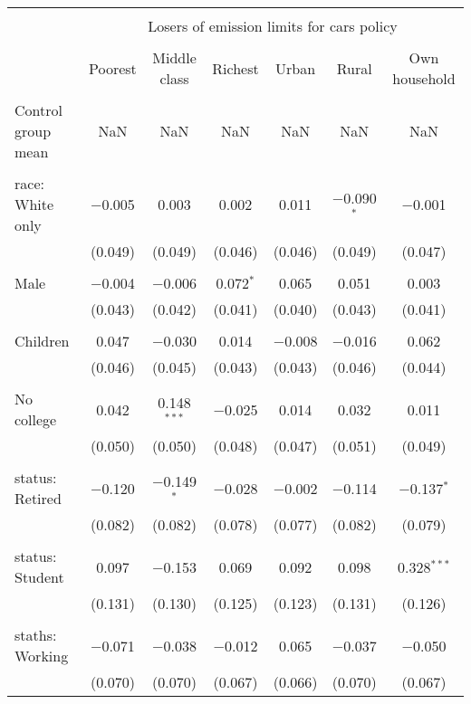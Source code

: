 
\begin{tabular}{@{\extracolsep{5pt}}lcccccc} 
\\[-1.8ex]\hline 
\hline \\[-1.8ex] 
 & \multicolumn{6}{c}{Losers of emission limits for cars policy} \\ 
\cline{2-7} 
\\[-1.8ex] & Poorest & Middle class & Richest & Urban & Rural & Own household \\ 
\hline \\[-1.8ex] 
 Control group mean & NaN & NaN & NaN & NaN & NaN & NaN  \\ \hline \\[-1.8ex] race: White only & $-$0.005 & 0.003 & 0.002 & 0.011 & $-$0.090$^{*}$ & $-$0.001 \\ 
  & (0.049) & (0.049) & (0.046) & (0.046) & (0.049) & (0.047) \\ 
  & & & & & & \\ 
 Male & $-$0.004 & $-$0.006 & 0.072$^{*}$ & 0.065 & 0.051 & 0.003 \\ 
  & (0.043) & (0.042) & (0.041) & (0.040) & (0.043) & (0.041) \\ 
  & & & & & & \\ 
 Children & 0.047 & $-$0.030 & 0.014 & $-$0.008 & $-$0.016 & 0.062 \\ 
  & (0.046) & (0.045) & (0.043) & (0.043) & (0.046) & (0.044) \\ 
  & & & & & & \\ 
 No college & 0.042 & 0.148$^{***}$ & $-$0.025 & 0.014 & 0.032 & 0.011 \\ 
  & (0.050) & (0.050) & (0.048) & (0.047) & (0.051) & (0.049) \\ 
  & & & & & & \\ 
 status: Retired & $-$0.120 & $-$0.149$^{*}$ & $-$0.028 & $-$0.002 & $-$0.114 & $-$0.137$^{*}$ \\ 
  & (0.082) & (0.082) & (0.078) & (0.077) & (0.082) & (0.079) \\ 
  & & & & & & \\ 
 status: Student & 0.097 & $-$0.153 & 0.069 & 0.092 & 0.098 & 0.328$^{***}$ \\ 
  & (0.131) & (0.130) & (0.125) & (0.123) & (0.131) & (0.126) \\ 
  & & & & & & \\ 
 staths: Working & $-$0.071 & $-$0.038 & $-$0.012 & 0.065 & $-$0.037 & $-$0.050 \\ 
  & (0.070) & (0.070) & (0.067) & (0.066) & (0.070) & (0.067) \\ 

\end{tabular}
